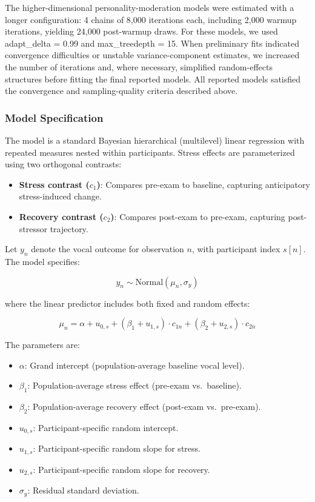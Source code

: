 \documentclass[
  english,
  man,floatsintext]{apa6}
\providecommand{\tightlist}{%
  \setlength{\itemsep}{0pt}\setlength{\parskip}{0pt}}
\begin{document}
The higher-dimensional personality-moderation models were estimated with a longer configuration: 4 chains of 8,000 iterations each, including 2,000 warmup iterations, yielding 24,000 post-warmup draws. For these models, we used adapt\_delta = 0.99 and max\_treedepth = 15. When preliminary fits indicated convergence difficulties or unstable variance-component estimates, we increased the number of iterations and, where necessary, simplified random-effects structures before fitting the final reported models. All reported models satisfied the convergence and sampling-quality criteria described above.

\subsubsection{Model Specification}\label{model-specification}

The model is a standard Bayesian hierarchical (multilevel) linear regression with repeated measures nested within participants. Stress effects are parameterized using two orthogonal contrasts:

\begin{itemize}
\tightlist
\item
  \textbf{Stress contrast (\(c_1\))}: Compares pre-exam to baseline, capturing anticipatory stress-induced change.
\item
  \textbf{Recovery contrast (\(c_2\))}: Compares post-exam to pre-exam, capturing post-stressor trajectory.
\end{itemize}

Let \(y_n\) denote the vocal outcome for observation \(n\), with participant index \(s[n]\). The model specifies:

\[
y_n \sim \text{Normal}(\mu_n, \sigma_y)
\]

where the linear predictor includes both fixed and random effects:

\[
\mu_n = \alpha + u_{0,s} + (\beta_1 + u_{1,s}) \cdot c_{1n} + (\beta_2 + u_{2,s}) \cdot c_{2n}
\]

The parameters are:

\begin{itemize}
\tightlist
\item
  \(\alpha\): Grand intercept (population-average baseline vocal level).
\item
  \(\beta_1\): Population-average stress effect (pre-exam vs.~baseline).
\item
  \(\beta_2\): Population-average recovery effect (post-exam vs.~pre-exam).
\item
  \(u_{0,s}\): Participant-specific random intercept.
\item
  \(u_{1,s}\): Participant-specific random slope for stress.
\item
  \(u_{2,s}\): Participant-specific random slope for recovery.
\item
  \(\sigma_y\): Residual standard deviation.
\end{itemize}
\end{document}
